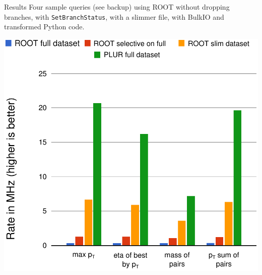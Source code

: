 \documentclass{beamer}
\begin{document}




\begin{frame}{Results}
\vspace{0.5 cm}
Four sample queries (see backup) using ROOT \textcolor{results1}{without dropping branches}, \textcolor{results2}{with {\tt SetBranchStatus}}, \textcolor{results3}{with a slimmer file}, \textcolor{results4}{with BulkIO and transformed Python code}.

\begin{center}
\includegraphics[width=0.65\linewidth]{root-and-plur.pdf}
\end{center}
\end{frame}
\end{document}
